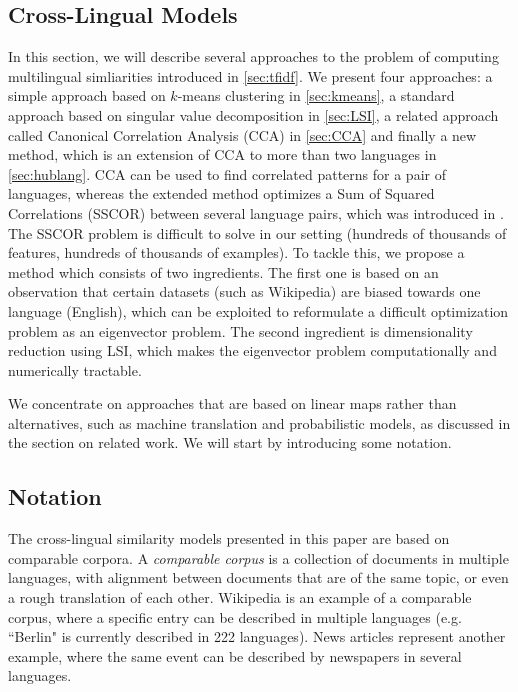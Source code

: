 \documentclass[twoside,11pt]{article}
\begin{document}
\subsection{Cross-Lingual Models}\label{sec:models}
In this section, we will describe several approaches to the problem of computing multilingual simliarities introduced in \ref{sec:tfidf}. We present four approaches:
a simple approach based on $k$-means clustering in \ref{sec:kmeans}, a standard approach based on singular value decomposition in \ref{sec:LSI}, a related
approach called Canonical Correlation Analysis (CCA) in \ref{sec:CCA} and finally a new method, which is an extension of CCA to more than two languages in \ref{sec:hublang}.
%
CCA can be used to find correlated patterns for a pair of languages, whereas the extended method optimizes a
Sum of Squared Correlations (SSCOR) between several language pairs, which was introduced in \cite{Kettenring}. The SSCOR problem is difficult to solve in our setting (hundreds of thousands of features, hundreds of thousands of examples). To tackle this, we propose a method which consists of two ingredients.
 The first one is based on an observation that certain datasets (such as Wikipedia) are biased towards one language (English), which can be exploited
 to reformulate a difficult optimization problem as an eigenvector problem. The second ingredient is dimensionality reduction using LSI, which
 makes the eigenvector problem computationally and numerically tractable.

We concentrate on approaches that are based on linear maps rather than alternatives, such as machine translation and probabilistic models, as discussed in the section on related work.
We will start by introducing some notation.

\subsection{Notation}\label{sec:notation}

The cross-lingual similarity models presented in this paper are based on comparable corpora. A \emph{comparable corpus} is a collection of documents in multiple languages, with alignment between documents that are of the same topic, or even a rough translation of each other. Wikipedia is an example of a comparable corpus, where a specific entry can be described in multiple languages (e.g. ``Berlin" is currently described in 222 languages). News articles represent another example, where the same event can be described by newspapers in several languages.
\end{document}

